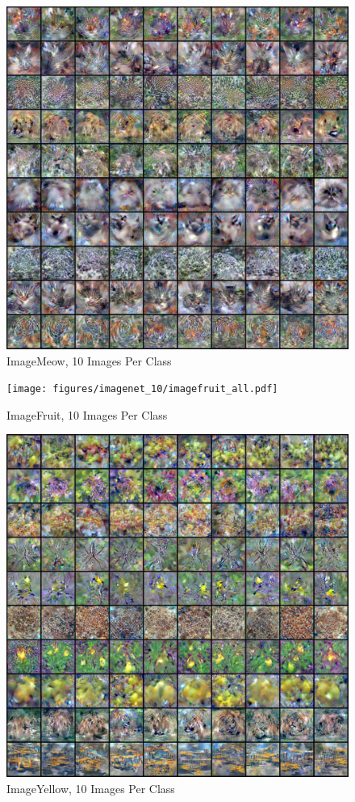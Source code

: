 \begin{figure}
    \centering
    \includegraphics[width=\linewidth]{figures/imagenet_10/imagemeow_all.pdf}
    \caption{ImageMeow, 10 Images Per Class}
    \label{fig:meow_10}
\end{figure}
\begin{figure}
    \centering
    \texttt{[image: figures/imagenet\_10/imagefruit\_all.pdf]}
    \caption{ImageFruit, 10 Images Per Class}
    \label{fig:fruit_10}
\end{figure}
\begin{figure}
    \centering
    \includegraphics[width=\linewidth]{figures/imagenet_10/imageyellow_all.pdf}
    \caption{ImageYellow, 10 Images Per Class}
    \label{fig:yellow_10}
\end{figure}
\vfill\break